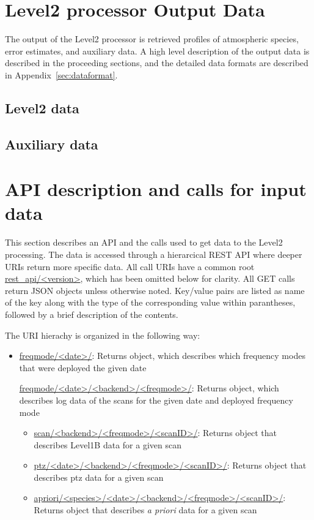 \section{Level2 processor Output Data}
The output of the Level2 processor is retrieved
profiles of atmospheric species, error estimates,
and auxiliary data.
A high level description of the output data is described
in the proceeding sections, and the detailed data formats
are described in Appendix~\ref{sec:dataformat}.  

\subsection{Level2 data}
\subsection{Auxiliary data}

\section{API description and calls for input data}
\label{sec:api}

This section describes an API and the calls used to get data 
to the Level2 processing.
The data is accessed through a hierarcical REST API where deeper URIs return more
specific data.  All call URIs have a common root \url{rest_api/<version>}, which
has been omitted below for clarity.  All GET calls return JSON objects unless
otherwise noted. Key/value pairs are listed as name of the key
along with the type of the corresponding value within parantheses, followed
by a brief description of the contents.  

The URI hierachy is organized in the following way:
\begin{itemize}
    \item \url{freqmode/<date>/}: Returns object, which describes which frequency modes that were deployed the
    given date
    \begin{itemize}
        \url{freqmode/<date>/<backend>/<freqmode>/}: Returns object, which describes log data of the scans
        for the given date and deployed frequency mode
        \begin{itemize}
           \item \url{scan/<backend>/<freqmode>/<scanID>/}: Returns object that describes Level1B data for a given scan       
           \item \url{ptz/<date>/<backend>/<freqmode>/<scanID>/}: Returns object that describes ptz data for a given scan
           \item \url{apriori/<species>/<date>/<backend>/<freqmode>/<scanID>/}: Returns object that describes \textit{a priori} data for a given scan
        \end{itemize}  
    \end{itemize}
\end{itemize}
  


